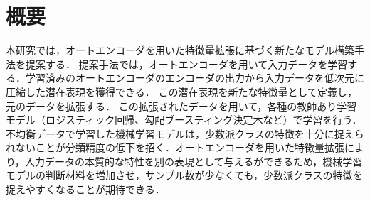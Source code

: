 \section{概要}
本研究では，オートエンコーダを用いた特徴量拡張に基づく新たなモデル構築手法を提案する．\cite{ae-article}
提案手法では，オートエンコーダを用いて入力データを学習する．学習済みのオートエンコーダのエンコーダの出力から入力データを低次元に圧縮した潜在表現を獲得できる．
この潜在表現を新たな特徴量として定義し，元のデータを拡張する．
この拡張されたデータを用いて，各種の教師あり学習モデル（ロジスティック回帰、勾配ブースティング決定木など）で学習を行う．
\\
不均衡データで学習した機械学習モデルは，少数派クラスの特徴を十分に捉えられないことが分類精度の低下を招く．オートエンコーダを用いた特徴量拡張により，入力データの本質的な特性を別の表現として与えるができるため，機械学習モデルの判断材料を増加させ，サンプル数が少なくても，少数派クラスの特徴を捉えやすくなることが期待できる．\\

